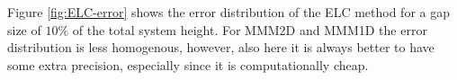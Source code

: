 Figure \ref{fig:ELC-error} shows the error distribution of the ELC
method for a gap size of $10\%$ of the total system height. For MMM2D
and MMM1D the error distribution is less homogenous, however, also
here it is always better to have some extra precision, especially
since it is computationally cheap.


